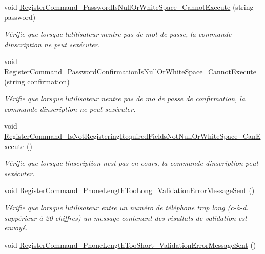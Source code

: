 \begin{DoxyCompactItemize}
void \hyperlink{class_boxes_1_1_tests_1_1_register_view_model_tests_a6296fbf606faf1914ac8f778ba216f55}{Register\+Command\+\_\+\+Password\+Is\+Null\+Or\+White\+Space\+\_\+\+Cannot\+Execute} (string password)
\begin{DoxyCompactList}\small\item\em Vérifie que lorsque l\textquotesingle{}utilisateur n\textquotesingle{}entre pas de mot de passe, la commande d\textquotesingle{}inscription ne peut s\textquotesingle{}exécuter. \end{DoxyCompactList}\item 
void \hyperlink{class_boxes_1_1_tests_1_1_register_view_model_tests_a0259bf119ee45060b88a6ad27f8f6dcc}{Register\+Command\+\_\+\+Password\+Confirmation\+Is\+Null\+Or\+White\+Space\+\_\+\+Cannot\+Execute} (string confirmation)
\begin{DoxyCompactList}\small\item\em Vérifie que lorsque l\textquotesingle{}utilisateur n\textquotesingle{}entre pas de mo de passe de confirmation, la commande d\textquotesingle{}inscription ne peut s\textquotesingle{}exécuter. \end{DoxyCompactList}\item 
void \hyperlink{class_boxes_1_1_tests_1_1_register_view_model_tests_acdf4564b1a3c9672cb5d4fb247938a11}{Register\+Command\+\_\+\+Is\+Not\+Registering\+Required\+Fields\+Not\+Null\+Or\+White\+Space\+\_\+\+Can\+Execute} ()
\begin{DoxyCompactList}\small\item\em Vérifie que lorsque l\textquotesingle{}inscription n\textquotesingle{}est pas en cours, la commande d\textquotesingle{}inscription peut s\textquotesingle{}exécuter. \end{DoxyCompactList}\item 
void \hyperlink{class_boxes_1_1_tests_1_1_register_view_model_tests_a611e31c1b4d3547cf1836744ef72042a}{Register\+Command\+\_\+\+Phone\+Length\+Too\+Long\+\_\+\+Validation\+Error\+Message\+Sent} ()
\begin{DoxyCompactList}\small\item\em Vérifie que lorsque l\textquotesingle{}utilisateur entre un numéro de téléphone trop long (c-\/à-\/d. suppérieur à 20 chiffres) un message contenant des résultats de validation est envoyé. \end{DoxyCompactList}\item 
void \hyperlink{class_boxes_1_1_tests_1_1_register_view_model_tests_a2eba1232bbe10748e9d9f8deec3c2348}{Register\+Command\+\_\+\+Phone\+Length\+Too\+Short\+\_\+\+Validation\+Error\+Message\+Sent} ()

\end{DoxyCompactItemize}
